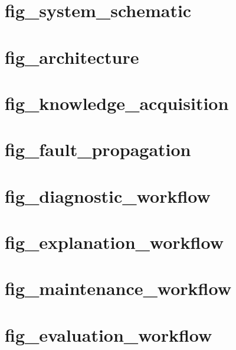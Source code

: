 \documentclass[11pt,a4paper]{article}
\begin{document}
\section*{fig\_system\_schematic}
\begin{center}

\end{center}
\clearpage
\section*{fig\_architecture}
\begin{center}

\end{center}
\clearpage
\section*{fig\_knowledge\_acquisition}
\begin{center}

\end{center}
\clearpage
\section*{fig\_fault\_propagation}
\begin{center}

\end{center}
\clearpage
\section*{fig\_diagnostic\_workflow}
\begin{center}

\end{center}
\clearpage
\section*{fig\_explanation\_workflow}
\begin{center}

\end{center}
\clearpage
\section*{fig\_maintenance\_workflow}
\begin{center}

\end{center}
\clearpage
\section*{fig\_evaluation\_workflow}
\begin{center}

\end{center}
\clearpage
\end{document}
